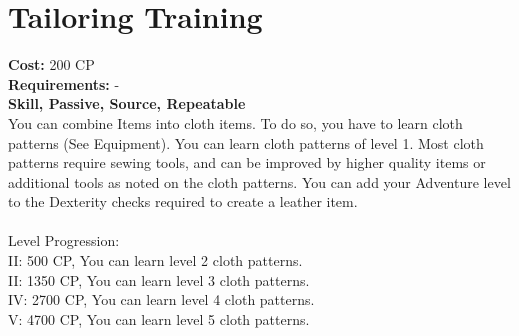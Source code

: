 \section{Tailoring Training}
\textbf{Cost:} 200 CP\\
\textbf{Requirements:} -\\
\textbf{Skill, Passive, Source, Repeatable}\\
You can combine Items into cloth items. To do so, you have to learn cloth patterns (See Equipment). You can learn cloth patterns of level 1. Most cloth patterns require sewing tools, and can be improved by higher quality items or additional tools as noted on the cloth patterns. You can add your Adventure level to the Dexterity checks required to create a leather item.\\
\\
Level Progression:\\
II: 500 CP, You can learn level 2 cloth patterns.\\
II: 1350 CP, You can learn level 3 cloth patterns.\\
IV: 2700 CP, You can learn level 4 cloth patterns.\\
V: 4700 CP, You can learn level 5 cloth patterns.\\